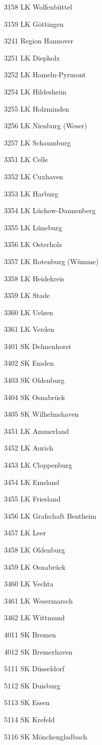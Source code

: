 3158  LK Wolfenbüttel

3159  LK Göttingen

3241  Region Hannover

3251  LK Diepholz

3252  LK Hameln-Pyrmont

3254  LK Hildesheim

3255  LK Holzminden

3256  LK Nienburg (Weser)

3257  LK Schaumburg

3351  LK Celle

3352  LK Cuxhaven

3353  LK Harburg

3354  LK Lüchow-Dannenberg

3355  LK Lüneburg

3356  LK Osterholz

3357  LK Rotenburg (Wümme)

3358  LK Heidekreis

3359  LK Stade

3360  LK Uelzen

3361  LK Verden

3401  SK Delmenhorst

3402  SK Emden

3403  SK Oldenburg

3404  SK Osnabrück

3405  SK Wilhelmshaven

3451  LK Ammerland

3452  LK Aurich

3453  LK Cloppenburg

3454  LK Emsland

3455  LK Friesland

3456  LK Grafschaft Bentheim

3457  LK Leer

3458  LK Oldenburg

3459  LK Osnabrück

3460  LK Vechta

3461  LK Wesermarsch

3462  LK Wittmund

4011  SK Bremen

4012  SK Bremerhaven

5111  SK Düsseldorf

5112  SK Duisburg

5113  SK Essen

5114  SK Krefeld

5116  SK Mönchengladbach

